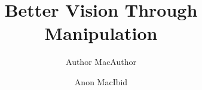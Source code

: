 \documentclass[]{article}
\begin{document}
 

\onecolumn



\title{Better Vision Through Manipulation}

\author{Author MacAuthor \and Anon MacIbid}



\maketitle

\ifdraft
  \thispagestyle{plain}
  \pagestyle{plain}
\fi























\end{document}
